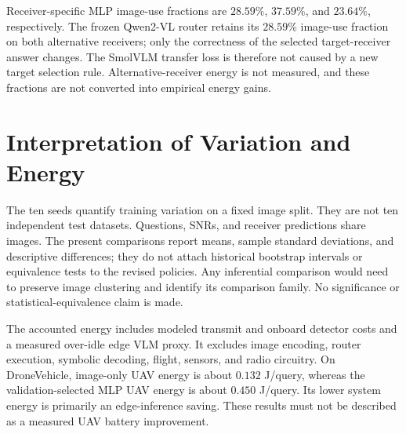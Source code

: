 \documentclass[12pt,lettersize,journal,onecolumn]{IEEEtran}
\begin{document}
Receiver-specific MLP image-use fractions are $28.59\%$, $37.59\%$,
and $23.64\%$, respectively. The frozen Qwen2-VL router retains its
$28.59\%$ image-use fraction on both alternative receivers; only
the correctness of the selected target-receiver answer changes.
The SmolVLM transfer loss is therefore not caused by a new target
selection rule. Alternative-receiver energy is not measured,
and these fractions are not converted into empirical energy gains.

\section{Interpretation of Variation and Energy}
The ten seeds quantify training variation on a fixed image split.
They are not ten independent test datasets. Questions, SNRs, and
receiver predictions share images. The present comparisons report
means, sample standard deviations, and descriptive differences;
they do not attach historical bootstrap intervals or equivalence
tests to the revised policies. Any inferential comparison would
need to preserve image clustering and identify its comparison
family. No significance or statistical-equivalence claim is made.

The accounted energy includes modeled transmit and onboard detector
costs and a measured over-idle edge VLM proxy. It excludes image
encoding, router execution, symbolic decoding, flight, sensors,
and radio circuitry. On DroneVehicle, image-only UAV energy is
about $0.132$ J/query, whereas the validation-selected MLP UAV
energy is about $0.450$ J/query. Its lower system energy is
primarily an edge-inference saving. These results must not be
described as a measured UAV battery improvement.
\end{document}
